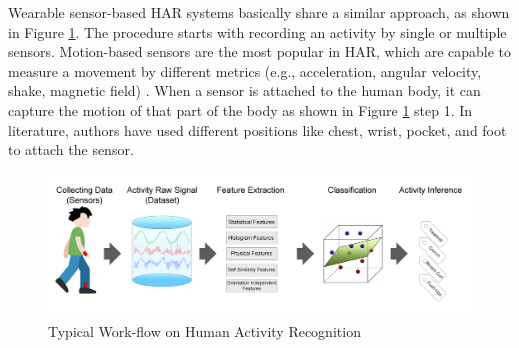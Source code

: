 \documentclass[journal,article,submit,moreauthors,pdftex]{Definitions/mdpi}
\begin{document}
Wearable sensor-based HAR systems basically share a similar approach, as shown in Figure \ref{fig:main_approach}. The procedure starts with recording an activity by single or multiple sensors\cite{s140610146}. Motion-based sensors are the most popular in HAR, which are capable to measure a movement by different metrics (e.g., acceleration, angular velocity, shake, magnetic field) \cite{hassan2018robust}. When a sensor is attached to the human body, it can capture the motion of that part of the body as shown in Figure \ref{fig:main_approach} step 1. In literature\cite{morris2014recofit, s140610146, wang2019survey}, authors have used different positions like chest, wrist, pocket, and foot to attach the sensor.

\begin{figure}[H]
	\centering
	\includegraphics[width=14 cm]{Definitions/images/main_approach.jpg}
	\caption{Typical Work-flow on Human Activity Recognition}
	\label{fig:main_approach}
\end{figure} 
\end{document}
